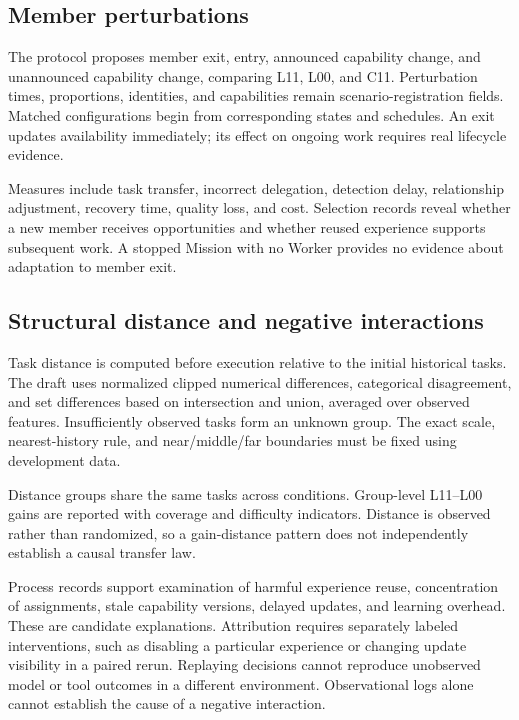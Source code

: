 \documentclass[
  english,
  11pt,
]{article}
\begin{document}
\subsection{Member perturbations}\label{member-perturbations}

The protocol proposes member exit, entry, announced capability change,
and unannounced capability change, comparing L11, L00, and C11.
Perturbation times, proportions, identities, and capabilities remain
scenario-registration fields. Matched configurations begin from
corresponding states and schedules. An exit updates availability
immediately; its effect on ongoing work requires real lifecycle
evidence.

Measures include task transfer, incorrect delegation, detection delay,
relationship adjustment, recovery time, quality loss, and cost.
Selection records reveal whether a new member receives opportunities and
whether reused experience supports subsequent work. A stopped Mission
with no Worker provides no evidence about adaptation to member exit.

\subsection{Structural distance and negative
interactions}\label{structural-distance-and-negative-interactions}

Task distance is computed before execution relative to the initial
historical tasks. The draft uses normalized clipped numerical
differences, categorical disagreement, and set differences based on
intersection and union, averaged over observed features. Insufficiently
observed tasks form an unknown group. The exact scale, nearest-history
rule, and near/middle/far boundaries must be fixed using development
data.

Distance groups share the same tasks across conditions. Group-level
L11--L00 gains are reported with coverage and difficulty indicators.
Distance is observed rather than randomized, so a gain-distance pattern
does not independently establish a causal transfer law.

Process records support examination of harmful experience reuse,
concentration of assignments, stale capability versions, delayed
updates, and learning overhead. These are candidate explanations.
Attribution requires separately labeled interventions, such as disabling
a particular experience or changing update visibility in a paired rerun.
Replaying decisions cannot reproduce unobserved model or tool outcomes
in a different environment. Observational logs alone cannot establish
the cause of a negative interaction.
\end{document}
